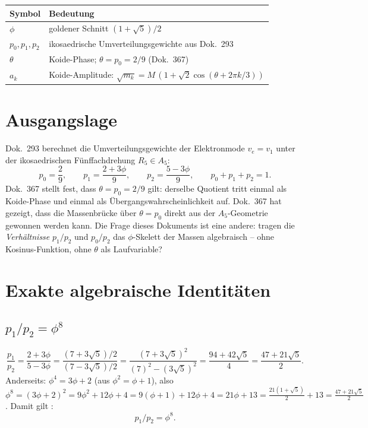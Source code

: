 \medskip
\begin{tabular}{@{}lp{11cm}@{}}
\toprule
\textbf{Symbol} & \textbf{Bedeutung} \\
\midrule
$\phi$ & goldener Schnitt $(1+\sqrt5)/2$ \\
$p_0,p_1,p_2$ & ikosaedrische Umverteilungsgewichte aus Dok.~293 \\
$\theta$ & Koide-Phase; $\theta=p_0=2/9$ (Dok.~367) \\
$a_k$ & Koide-Amplitude: $\sqrt{m_k}=M\,(1+\sqrt2\cos(\theta+2\pi k/3))$ \\
\bottomrule
\end{tabular}

\section{Ausgangslage}

Dok.~293 berechnet die Umverteilungsgewichte der Elektronmode $v_e=v_1$ unter
der ikosaedrischen Fünffachdrehung $R_5\in A_5$:
\[
  p_0 = \frac{2}{9}, \qquad
  p_1 = \frac{2+3\phi}{9}, \qquad
  p_2 = \frac{5-3\phi}{9}, \qquad
  p_0+p_1+p_2=1.
\]
Dok.~367 stellt fest, dass $\theta=p_0=2/9$ gilt: derselbe Quotient tritt einmal
als Koide-Phase und einmal als Übergangswahrscheinlichkeit auf. Dok.~367 hat gezeigt, dass die Massenbrücke über $\theta = p_0$ direkt aus
der $A_5$-Geometrie gewonnen werden kann. Die Frage dieses Dokuments ist eine
andere: tragen die \emph{Verhältnisse} $p_1/p_2$ und $p_0/p_2$ das $\phi$-Skelett
der Massen algebraisch -- ohne Kosinus-Funktion, ohne $\theta$ als Laufvariable?

\section{Exakte algebraische Identitäten}

\subsection{$p_1/p_2 = \phi^8$}

\begin{equation}\label{eq:p1p2}
  \frac{p_1}{p_2} = \frac{2+3\phi}{5-3\phi} = \frac{(7+3\sqrt5)/2}{(7-3\sqrt5)/2}
  = \frac{(7+3\sqrt5)^2}{(7)^2-(3\sqrt5)^2} = \frac{94+42\sqrt5}{4} = \frac{47+21\sqrt5}{2}.
\end{equation}
Anderseits: $\phi^4 = 3\phi+2$ (aus $\phi^2=\phi+1$), also
$\phi^8 = (3\phi+2)^2 = 9\phi^2+12\phi+4 = 9(\phi+1)+12\phi+4 = 21\phi+13
= \tfrac{21(1+\sqrt5)}{2}+13 = \tfrac{47+21\sqrt5}{2}$. Damit gilt \BM:
\[
  \boxed{p_1/p_2 = \phi^8.}
\]

